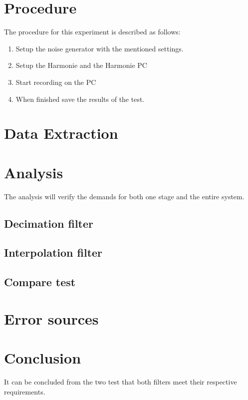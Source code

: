 \section{Procedure}
The procedure for this experiment is described as follows:
\vspace{-5mm}
\begin{enumerate}
\item Setup the noise generator with the mentioned settings.
\item Setup the Harmonie and the Harmonie PC
\item Start recording on the PC
\item When finished save the results of the test.
\end{enumerate}

\section{Data Extraction}


\section{Analysis}
The analysis will verify the demands for both one stage and the entire system.

\subsection*{Decimation filter}


\subsection*{Interpolation filter}

\subsection*{Compare test}


\section{Error sources}


\section{Conclusion}
It can be concluded from the two test that both filters meet their respective requirements.
